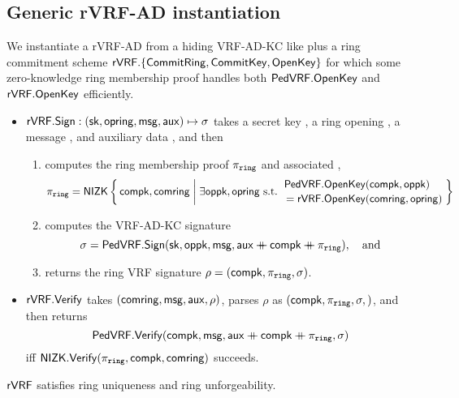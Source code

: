 \subsection{Generic rVRF-AD instantiation}

We instantiate a rVRF-AD from a hiding VRF-AD-KC like \PedVRF plus
a ring commitment scheme
 ${\mathsf{rVRF}}.\{ {\mathsf{CommitRing}}, {\mathsf{CommitKey}}, {\mathsf{OpenKey}} \}$
for which some zero-knowledge ring membership proof handles both
 ${\mathsf{PedVRF}}.{\mathsf{OpenKey}}$ and ${\mathsf{rVRF}}.{\mathsf{OpenKey}}$
efficiently.

\begin{itemize}
\item ${\mathsf{rVRF}}.{\mathsf{Sign}} : (\mathsf{sk},\mathsf{opring},\mathsf{msg},\mathsf{aux}) \mapsto \sigma$ takes
 a secret key \sk, a ring opening \openring, a message \msg, and auxiliary data \aux, and then \\
 \begin{enumerate}
 \item computes the ring membership proof $\piring$ and associated \openpk,
  $$ \piring = \NIZK \Setst{ \compk, \comring }{
  \exists \openpk,\openring \textrm{\ s.t.\ } 
  \genfrac{}{}{0pt}{}{\PedVRF.\OpenKey(\compk,\openpk) \quad}{\,\, = \rVRF.\OpenKey(\comring,\openring)}
  } $$
 \item computes the VRF-AD-KC signature
  $$ \sigma = {\mathsf{PedVRF}}.{\mathsf{Sign}}(\mathsf{sk},\mathsf{oppk},\mathsf{msg},\mathsf{aux} \mathbin{+\mkern-10mu+} \mathsf{compk} \mathbin{+\mkern-10mu+} \pi_{\mathtt{ring}}), \quad\textrm{and} $$ %
 \item returns the ring VRF signature $\rho = (\mathsf{compk},\pi_{\mathtt{ring}},\sigma)$.
 \end{enumerate}
\item ${\mathsf{rVRF}}.{\mathsf{Verify}}$ takes $(\mathsf{comring},\mathsf{msg},\mathsf{aux},\rho)$,
 parses $\rho$ as $(\mathsf{compk},\pi_{\mathtt{ring}},\sigma,)$,  and then returns
 $$ {\mathsf{PedVRF}}.{\mathsf{Verify}}(\mathsf{compk},\mathsf{msg},\mathsf{aux} \mathbin{+\mkern-10mu+} \mathsf{compk} \mathbin{+\mkern-10mu+} \pi_{\mathtt{ring}},\sigma) $$
 iff ${\mathsf{NIZK}}.{\mathsf{Verify}}(\pi_{\mathtt{ring}},\mathsf{compk},\mathsf{comring})$ succeeds. 
\end{itemize}

\begin{proposition}\label{prop:pedersen_rvrf}
${\mathsf{rVRF}}$ satisfies ring uniqueness and ring unforgeability.
\end{proposition}







\endinput










In this, we tie $\sigma$ to $\piring$ by expanding $\sigma$'s auxiliary data with $\piring$.

